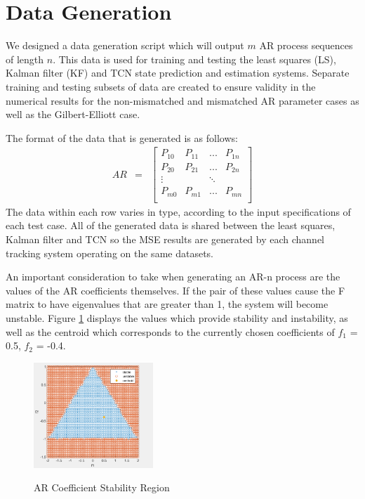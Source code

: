 \documentclass[twocolumn,letterpaper]{IEEEAerospaceCLS}  %
\begin{document}
\section{Data Generation}

\label{sec:dgen}

We designed a data generation script which will output $m$ AR process sequences of length $n$. This data is used for training and testing the least squares (LS), Kalman filter (KF) and TCN state prediction and estimation systems. Separate training and testing subsets of data are created to ensure validity in the numerical results for the non-mismatched and mismatched AR parameter cases as well as the Gilbert-Elliott case.

The format of the data that is generated is as follows: 
\begin{eqnarray*}
AR&=&\begin{bmatrix} 
P_{10} & P_{11} & ... & P_{1n} \\
P_{20} & P_{21} & ... & P_{2n} \\
\vdots &  & \ddots &  \\
P_{m0} & P_{m1} & ... & P_{mn} \\
\end{bmatrix}
\end{eqnarray*}
The data within each row varies in type, according to the input specifications of each test case. All of the generated data is shared between the least squares, Kalman filter and TCN so the MSE results are generated by each channel tracking system operating on the same datasets. 

An important consideration to take when generating an AR-n process are the values of the AR coefficients themselves. If the pair of these values cause the F matrix to have eigenvalues that are greater than 1, the system will become unstable. Figure \ref{stabf1f2} displays the values which provide stability and instability, as well as the centroid which corresponds to the currently chosen coefficients of $f_1$ = 0.5, $f_2$ = -0.4.

\begin{figure}[!h]
	\centering\includegraphics[width=0.4\textwidth]{figs/stability.PNG}\\
	\caption{AR Coefficient Stability Region}
	\label{stabf1f2}
\end{figure}
\end{document}
